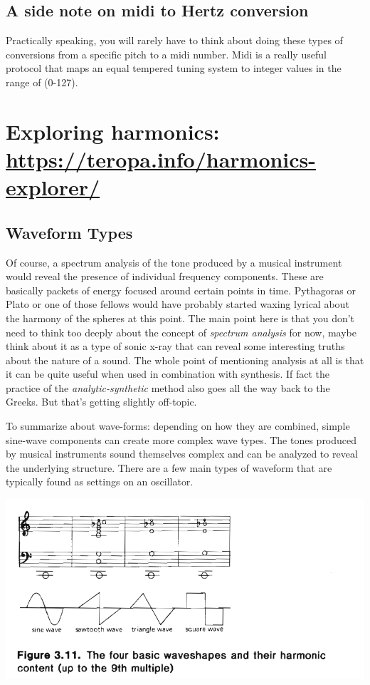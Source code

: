 \documentclass[11pt]{article}
\begin{document}
\subsection{A side note on midi to Hertz conversion}
\label{sec:orgf9d3fb7}
Practically speaking, you will rarely have to think about doing these
types of conversions from a specific pitch to a midi number. Midi is a
really useful protocol that maps an equal tempered tuning system to
integer values in the range of (0-127).


\section{Exploring harmonics: \url{https://teropa.info/harmonics-explorer/}}
\label{sec:org23bf23b}

\subsection{Waveform Types}
\label{sec:orgb979c77}
Of course, a spectrum analysis of the tone produced by a musical
instrument would reveal the presence of individual frequency
components. These are basically packets of energy focused around
certain points in time. Pythagoras or Plato or one of those fellows
would have probably started waxing lyrical about the harmony of the
spheres at this point. 
The main point here is that you don't need to think too deeply about
the concept of \emph{spectrum analysis} for now, maybe think about it as a
type of sonic x-ray that can reveal some interesting truths about the
nature of a sound. 
The whole point of mentioning analysis at all is that it can be quite
useful when used in combination with synthesis. If fact the practice
of the \emph{analytic-synthetic} method also goes all the way back to the
Greeks. But that's getting slightly off-topic.   

To summarize about wave-forms: depending on how they are combined,
simple sine-wave components can create more complex wave types. The
tones produced by musical instruments sound themselves complex and can
be analyzed to reveal the underlying structure. There are a few main
types of waveform that are typically found as settings on an oscillator.

\begin{center}
\includegraphics[width=.9\linewidth]{./images/waveforms.png}
\end{center}
\end{document}

